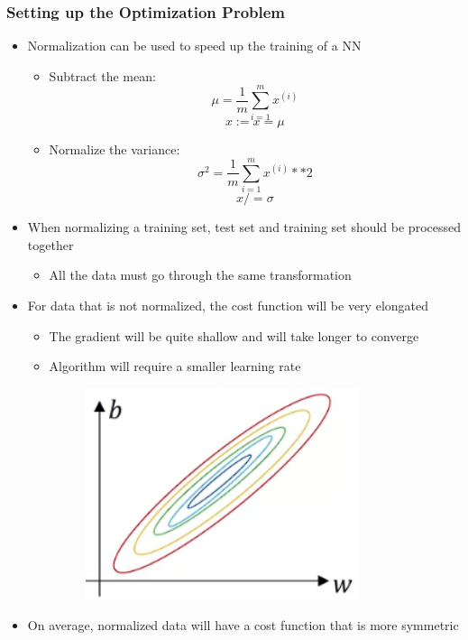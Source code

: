 \documentclass[12pt, letterpaper]{article}
\begin{document}
    \subsubsection{Setting up the Optimization Problem}
    \begin{itemize}
        \item Normalization can be used to speed up the training of a NN
        \begin{itemize}
            \item Subtract the mean:
            $$\mu=\frac{1}{m}\sum_{i=1}^mx^{(i)}$$
            $$x:=x=\mu$$
            \item Normalize the variance:
            $$\sigma^2=\frac{1}{m}\sum_{i=1}^mx^{(i)}**2$$ 
            $$x/=\sigma$$
        \end{itemize}
        \item When normalizing a training set, test set and training set should be processed together
        \begin{itemize}
            \item All the data must go through the same transformation
        \end{itemize}
        \item For data that is not normalized, the cost function will be very elongated
        \begin{itemize}
            \item The gradient will be quite shallow and will take longer to converge
            \item Algorithm will require a smaller learning rate
            \vspace{5mm}
            \begin{figure}[ht]
                \centering
                \includegraphics[width=8cm]{18.png}
            \end{figure}
        \end{itemize}
        \item On average, normalized data will have a cost function that is more symmetric

\end{itemize}
\end{document}
